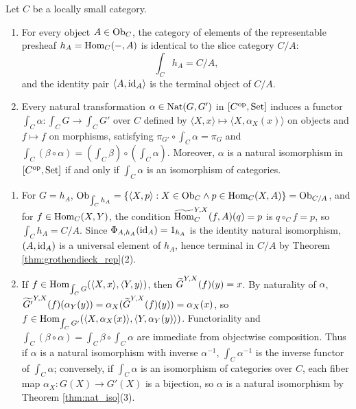 \documentclass[10pt,a4paper]{article}
\begin{document}
\begin{theorem}\label{thm:slice_el}
Let $C$ be a locally small category.
\begin{enumerate}
\item For every object $A \in {\textrm{Ob}}_C$, the category of elements of the representable presheaf $h_A = {\textrm{Hom}}_C(-, A)$ is identical to the slice category $C / A$:
$$\int_C h_A = C / A,$$
and the identity pair $\langle A, {\textrm{id}}_A \rangle$ is the terminal object of $C / A$.
\item Every natural transformation $\alpha \in {\textrm{Nat}}(G, G')$ in $[C^{\textrm{op}}, {\textrm{Set}}]$ induces a functor $\int_C \alpha : \int_C G \to \int_C G'$ over $C$ defined by $\langle X, x \rangle \mapsto \langle X, \alpha_X(x) \rangle$ on objects and $f \mapsto f$ on morphisms, satisfying $\pi_{G'} \circ \int_C \alpha = \pi_G$ and $\int_C (\beta \circ \alpha) = (\int_C \beta) \circ (\int_C \alpha)$. Moreover, $\alpha$ is a natural isomorphism in $[C^{\textrm{op}}, {\textrm{Set}}]$ if and only if $\int_C \alpha$ is an isomorphism of categories.
\end{enumerate}
\end{theorem}
\myprf
\begin{enumerate}
\item For $G = h_A$, ${\textrm{Ob}}_{\int_C h_A} = \{\langle X, p \rangle : X \in {\textrm{Ob}}_C \land p \in {\textrm{Hom}}_C(X, A)\} = {\textrm{Ob}}_{C/A}$, and for $f \in {\textrm{Hom}}_C(X, Y)$, the condition ${\widetilde{{\textrm{Hom}}}\textrm{}}_C^{Y,X}(f, A)(q) = p$ is $q \circ_C f = p$, so $\int_C h_A = C / A$. Since $\Phi_{A,h_A}({\textrm{id}}_A) = 1_{h_A}$ is the identity natural isomorphism, $(A, {\textrm{id}}_A)$ is a universal element of $h_A$, hence terminal in $C / A$ by Theorem \ref{thm:grothendieck_rep}(2).
\item If $f \in {\textrm{Hom}}_{\int_C G}(\langle X, x \rangle, \langle Y, y \rangle)$, then ${\widetilde{G}\textrm{}}^{Y,X}(f)(y) = x$. By naturality of $\alpha$, $\widetilde{G'}^{Y,X}(f)(\alpha_Y(y)) = \alpha_X({\widetilde{G}\textrm{}}^{Y,X}(f)(y)) = \alpha_X(x)$, so $f \in {\textrm{Hom}}_{\int_C G'}(\langle X, \alpha_X(x) \rangle, \langle Y, \alpha_Y(y) \rangle)$. Functoriality and $\int_C(\beta \circ \alpha) = \int_C \beta \circ \int_C \alpha$ are immediate from objectwise composition. Thus if $\alpha$ is a natural isomorphism with inverse $\alpha^{-1}$, $\int_C \alpha^{-1}$ is the inverse functor of $\int_C \alpha$; conversely, if $\int_C \alpha$ is an isomorphism of categories over $C$, each fiber map $\alpha_X : G(X) \to G'(X)$ is a bijection, so $\alpha$ is a natural isomorphism by Theorem \ref{thm:nat_iso}(3).
\end{enumerate}
\myqed
\end{document}
